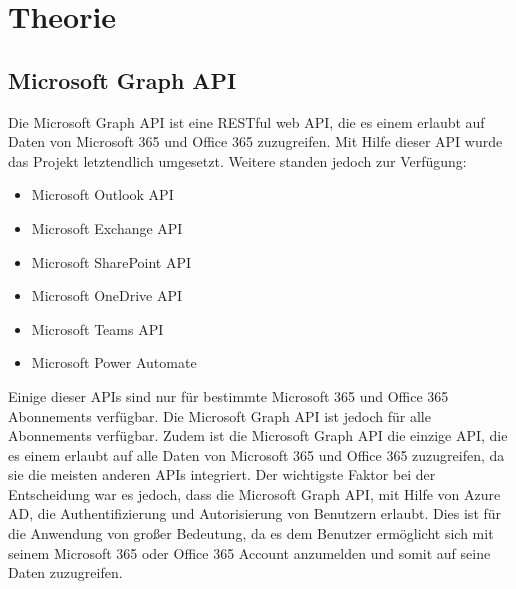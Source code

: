 


\section{Theorie}
\subsection{Microsoft Graph API}
Die Microsoft Graph API ist eine RESTful web API, die es einem erlaubt auf Daten von Microsoft 365 und Office 365 zuzugreifen.
Mit Hilfe dieser API wurde das Projekt letztendlich umgesetzt. Weitere standen jedoch zur Verfügung:
\begin{itemize}
    \item Microsoft Outlook API
    \item Microsoft Exchange API
    \item Microsoft SharePoint API
    \item Microsoft OneDrive API
    \item Microsoft Teams API
    \item Microsoft Power Automate
\end{itemize}
Einige dieser APIs sind nur für bestimmte Microsoft 365 und Office 365 Abonnements verfügbar. Die Microsoft Graph API ist jedoch für alle Abonnements verfügbar.
Zudem ist die Microsoft Graph API die einzige API, die es einem erlaubt auf alle Daten von Microsoft 365 und Office 365 zuzugreifen, da sie die meisten anderen APIs integriert.
Der wichtigste Faktor bei der Entscheidung war es jedoch, dass die Microsoft Graph API, mit Hilfe von Azure AD, die Authentifizierung und Autorisierung von Benutzern erlaubt. Dies ist für die Anwendung von großer Bedeutung, da es dem Benutzer ermöglicht sich mit seinem Microsoft 365 oder Office 365 Account anzumelden und somit auf seine Daten zuzugreifen.


